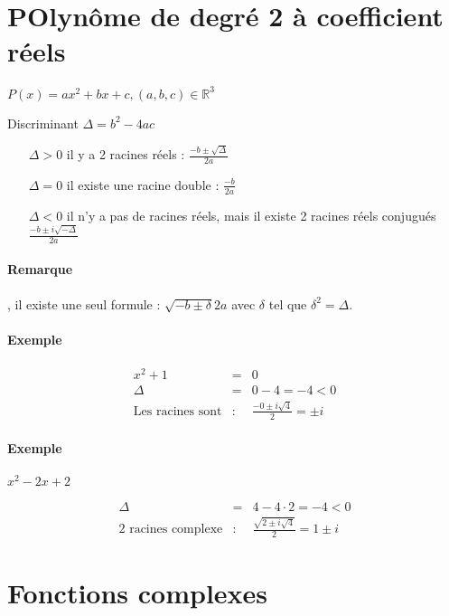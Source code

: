 \section{POlynôme de degré 2 à  coefficient réels}

$P(x) = ax^2 + bx + c, (a, b, c) \in \mathbb{R}^3$

Discriminant $\Delta = b^2 - 4ac$

\begin{itemize}
	\item[$\Delta > 0$] il y a 2 racines réels : $\frac{-b \pm \sqrt{\Delta}}{2a}$
	\item[$\Delta = 0$] il existe une racine double : $\frac{-b}{2a}$
	\item[$\Delta < 0$] il n'y a pas de racines réels, mais il existe 2 racines réels conjugués $\frac{-b \pm i\sqrt{-\Delta}}{2a}$
\end{itemize}

\paragraph{Remarque}, il existe une seul formule : $\sqrt{-b \pm \delta}{2a}$ avec $\delta$ tel que $\delta^2 = \Delta$.

\paragraph{Exemple}

\[\begin{array}{rcl}
	x^2 + 1 &=& 0 \\
	\Delta &=& 0 - 4 = -4 < 0\\
	\text{Les racines sont} &:& \frac{-0 \pm i\sqrt{4}}{2} = \pm i\end{array}\]

\paragraph{Exemple} $x^2 -2x + 2$

\[\begin{array}{rcl}
	\Delta &=& 4 - 4\cdot 2 = -4 < 0 \\
	\text{2 racines complexe} &:& \frac{\sqrt{2 \pm i\sqrt{4}}}{2} = 1 \pm i\end{array}\]

\section{Fonctions complexes}

